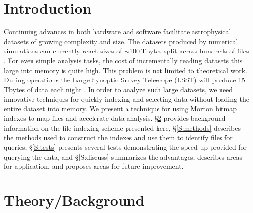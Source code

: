 \documentclass[apjl]{emulateapj}
\newcommand{\TB}{\,Tbytes}
\begin{document}
\section{Introduction}\label{S:intro}
Continuing advances in both hardware and software facilitate astrophysical datasets of growing complexity and size. The datasets produced by numerical simulations can currently reach sizes of $\sim$100\TB{ }split across hundreds of files \citep[e.g.][]{Croft2015}. For even simple analysis tasks, the cost of incrementally reading datasets this large into memory is quite high. This problem is not limited to theoretical work. During operations the Large Synoptic Survey Telescope (LSST) will produce 15\TB{ }of data each night \citep{Juric2015a}. In order to analyze such large datasets, we need innovative techniques for quickly indexing and selecting data without loading the entire dataset into memory. We present a technique for using Morton bitmap indexes to map files and accelerate data analysis. \S\ref{S:theory} provides background information on the file indexing scheme presented here, \S\ref{S:methods} describes the methods used to construct the indexes and use them to identify files for queries, \S\ref{S:tests} presents several tests demonstrating the speed-up provided for querying the data, and \S\ref{S:discuss} summarizes the advantages, describes areas for application, and proposes areas for future improvement.

\section{Theory/Background}\label{S:theory}

\end{document}
